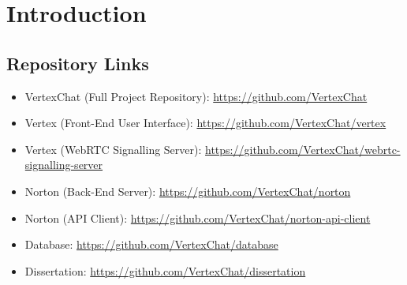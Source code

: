 \chapter{Introduction}
\section{Repository Links}
\begin{itemize}
    \item VertexChat (Full Project Repository): \url{https://github.com/VertexChat}
	\item Vertex (Front-End User Interface): \url{https://github.com/VertexChat/vertex}
	\item Vertex (WebRTC Signalling Server): \url{https://github.com/VertexChat/webrtc-signalling-server}
	\item Norton (Back-End Server): \url{https://github.com/VertexChat/norton}
	\item Norton (API Client): \url{https://github.com/VertexChat/norton-api-client}
	\item Database: \url{https://github.com/VertexChat/database}
	\item Dissertation: \url{https://github.com/VertexChat/dissertation}
\end{itemize}
